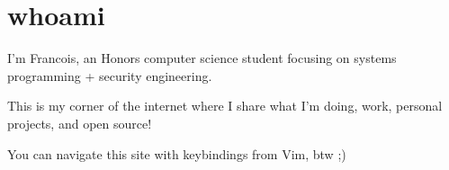 



\section{whoami}

I'm Francois, an Honors computer science student focusing on systems
programming + security engineering.

This is my corner of the internet where I share what I'm doing, work,
personal projects, and open source!

You can navigate this site with keybindings from Vim, btw ;)


